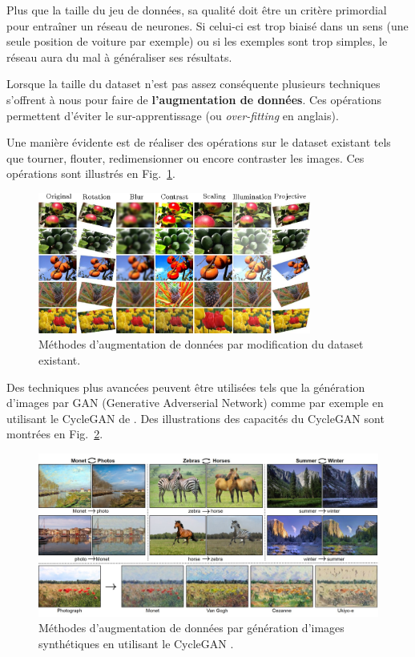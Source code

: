 \documentclass[12pt]{article}
\begin{document}
Plus que la taille du jeu de données, sa qualité doit être un critère primordial pour entraîner un réseau de neurones. Si celui-ci est trop biaisé dans un sens (une seule position de voiture par exemple) ou si les exemples sont trop simples, le réseau aura du mal à généraliser ses résultats.

Lorsque la taille du dataset n'est pas assez conséquente plusieurs techniques s'offrent à nous pour faire de \textbf{l'augmentation de données}. Ces opérations permettent d'éviter le sur-apprentissage (ou \textit{over-fitting} en anglais).

Une manière évidente est de réaliser des opérations sur le dataset existant tels que tourner, flouter, redimensionner ou encore contraster les images. Ces opérations sont illustrés en Fig.~\ref{fig:data_augmentation}.

\begin{figure}[htbp]
    \centering
    \includegraphics[width=0.8\textwidth]{figures/datasets/dataaugmention_illustration.png}
    \caption{Méthodes d'augmentation de données par modification du dataset existant.}
    \label{fig:data_augmentation}
\end{figure}

Des techniques plus avancées peuvent être utilisées tels que la génération d'images par GAN (Generative Adverserial Network) comme par exemple en utilisant le CycleGAN de \cite{CycleGAN2017}. Des illustrations des capacités du CycleGAN sont montrées en Fig.~\ref{fig:data_augmentation_gan}.

\begin{figure}[htbp]
    \centering
    \includegraphics[width=\textwidth]{figures/datasets/cycle_gan.jpg}
    \caption{Méthodes d'augmentation de données par génération d'images synthétiques en utilisant le CycleGAN \citep{CycleGAN2017}.}
    \label{fig:data_augmentation_gan}
\end{figure}
\end{document}
